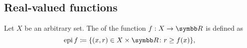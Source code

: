 \subsection{Real-valued functions}\label{subsec:real_valued_functions}

\begin{Definition}\label{def:epigraph}
  Let \( X \) be an arbitrary set. The  of the function \( f: X \to \BR \) is defined as
  \begin{equation*}
    \Epi f \coloneqq \{ (x, r) \in X \times \BR \colon r \geq f(x) \},
  \end{equation*}
\end{Definition}
